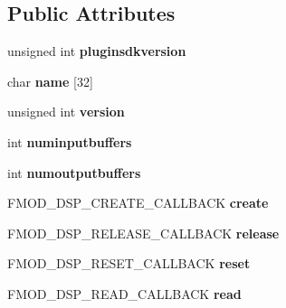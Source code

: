 \subsection*{Public Attributes}
\begin{DoxyCompactItemize}
\item 
\mbox{\label{structFMOD__DSP__DESCRIPTION_a1aa77090637614c1e9f185c11cceb242}} 
unsigned int {\bfseries pluginsdkversion}
\item 
\mbox{\label{structFMOD__DSP__DESCRIPTION_a1af8c6818751aaec3ed93bb8890073b8}} 
char {\bfseries name} \mbox{[}32\mbox{]}
\item 
\mbox{\label{structFMOD__DSP__DESCRIPTION_a2b39be891bd32c184883a673348bd29a}} 
unsigned int {\bfseries version}
\item 
\mbox{\label{structFMOD__DSP__DESCRIPTION_aa86c6fe14d379c7bd28c72583ff552d5}} 
int {\bfseries numinputbuffers}
\item 
\mbox{\label{structFMOD__DSP__DESCRIPTION_a7704565049cc02d55341a4050326101d}} 
int {\bfseries numoutputbuffers}
\item 
\mbox{\label{structFMOD__DSP__DESCRIPTION_a031561988b3fc12aa20608e9215f2a5f}} 
F\+M\+O\+D\+\_\+\+D\+S\+P\+\_\+\+C\+R\+E\+A\+T\+E\+\_\+\+C\+A\+L\+L\+B\+A\+CK {\bfseries create}
\item 
\mbox{\label{structFMOD__DSP__DESCRIPTION_a7a8a42bcbfec8068d462a63d6aa21dfa}} 
F\+M\+O\+D\+\_\+\+D\+S\+P\+\_\+\+R\+E\+L\+E\+A\+S\+E\+\_\+\+C\+A\+L\+L\+B\+A\+CK {\bfseries release}
\item 
\mbox{\label{structFMOD__DSP__DESCRIPTION_a8754cecb29633eac841bdb93193ac6f2}} 
F\+M\+O\+D\+\_\+\+D\+S\+P\+\_\+\+R\+E\+S\+E\+T\+\_\+\+C\+A\+L\+L\+B\+A\+CK {\bfseries reset}
\item 
\mbox{\label{structFMOD__DSP__DESCRIPTION_aaba9380bba61ae8e11ecd07832739778}} 
F\+M\+O\+D\+\_\+\+D\+S\+P\+\_\+\+R\+E\+A\+D\+\_\+\+C\+A\+L\+L\+B\+A\+CK {\bfseries read}

\end{DoxyCompactItemize}
